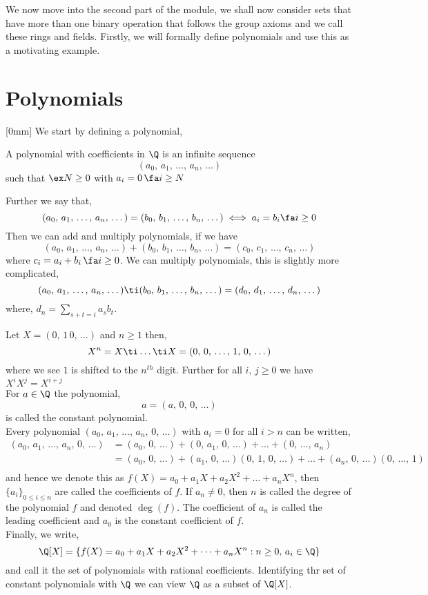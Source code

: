 We now move into the second part of the module, we shall now consider sets that have more than one binary operation that follows the group axioms and we call these rings and fields. Firstly, we will formally define polynomials and use this as a motivating example.

\section{Polynomials}[0mm]
We start by defining a polynomial,
\begin{ndefi}[Polynomial]
  A polynomial with coefficients in $\Q$ is an infinite sequence
  $$ (a_0,\,a_1,\,\dots,\,a_n,\,\dots) $$
  such that $\ex N \ge 0$ with $a_i =0\,\fa i \ge N$
\end{ndefi}

Further we say that,
$$ (a_0,\, a_1,\,\dots,\,a_n,\,\dots) = (b_0,\, b_1,\,\dots,\,b_n,\,\dots) \iff a_i = b_i \fa i \ge 0 $$
Then we can add and multiply polynomials, if we have
$$ (a_0,\, a_1,\,\dots,\,a_n,\,\dots) + (b_0,\, b_1,\,\dots,\,b_n,\,\dots)= (c_0,\, c_1,\,\dots,\,c_n,\,\dots) $$
where $c_i = a_i + b_i\, \fa i \ge 0$. We can multiply polynomials, this is slightly more complicated,
$$ (a_0,\, a_1,\,\dots,\,a_n,\,\dots) \ti (b_0,\, b_1,\,\dots,\,b_n,\,\dots) = (d_0,\, d_1,\,\dots,\,d_n,\,\dots) $$
where, $d_n = \sum_{s+t = i} a_sb_t$.

\begin{notation}
  Let $X = (0,\,1\,0,\,\dots)$ and $n \ge 1$ then,
  $$ X^n = X \ti \dots \ti X = (0,\,0,\,\dots,\,1,\,0,\,\dots) $$
  where we see $1$ is shifted to the $n^{th}$ digit. Further for all $i,\,j \ge 0$ we have $X^iX^j = X^{i+j}$\\

  For $a \in \Q$ the polynomial,
  $$ a = (a,\,0,\,0,\,\dots) $$
  is called the constant polynomial.\\

  Every polynomial $(a_0,\,a_1,\,\dots,\,a_n,\,0,\,\dots)$ with $a_i = 0$ for all $i > n$ can be written,
  \begin{align*}
    (a_0,\,a_1,\,\dots,\,a_n,\,0,\,\dots) &= (a_0,\,0,\,\dots) + (0,\,a_1,\,0,\,\dots) + \dots + (0,\,\dots,\,a_n) \\
    &= (a_0,\,0,\,\dots) + (a_1,\,0,\,\dots)(0,\,1,\,0,\,\dots) + \dots + (a_n,\,0,\,\dots)(0,\,\dots,\,1) \\
  \end{align*}
  and hence we denote this as $f(X) = a_0 + a_1X + a_2X^2 + \dots + a_nX^n$, then $\{a_i\}_{0 \le i \le n}$ are called the coefficients of $f$. If $a_n \ne 0$, then $n$ is called the degree of the polynomial $f$ and denoted $\deg(f)$. The coefficient of $a_n$ is called the leading coefficient and $a_0$ is the constant coefficient of $f$.\\

  Finally, we write,
  $$ \Q[X] = \{f(X) = a_0 + a_1X + a_2X^2 + \dots + a_nX^n : n \ge 0,\, a_i \in \Q\} $$
  and call it the set of polynomials with rational coefficients. Identifying thr set of constant polynomials with $\Q$ we can view $\Q$ as a subset of $\Q[X]$.
\end{notation}

